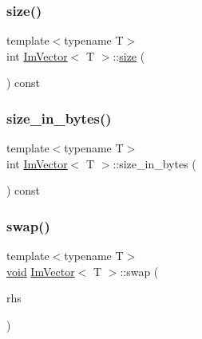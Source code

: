 \mbox{\label{structImVector_a8c903ecb1aaee0601b6a8ad835a4a435}} 
\subsubsection{\texorpdfstring{size()}{size()}}
{\footnotesize\ttfamily template$<$typename T$>$ \\
int \hyperlink{structImVector}{Im\+Vector}$<$ T $>$\+::\hyperlink{imgui__impl__opengl3__loader_8h_a3d1e3edfcf61ca2d831883e1afbad89e}{size} (\begin{DoxyParamCaption}{ }\end{DoxyParamCaption}) const\hspace{0.3cm}{\ttfamily [inline]}}

\mbox{\label{structImVector_ade9f2e937e47b0e0f9970dcfba038204}} 
\subsubsection{\texorpdfstring{size\+\_\+in\+\_\+bytes()}{size\_in\_bytes()}}
{\footnotesize\ttfamily template$<$typename T$>$ \\
int \hyperlink{structImVector}{Im\+Vector}$<$ T $>$\+::size\+\_\+in\+\_\+bytes (\begin{DoxyParamCaption}{ }\end{DoxyParamCaption}) const\hspace{0.3cm}{\ttfamily [inline]}}

\mbox{\label{structImVector_afcec0d2a1e28aebe412b6efd06f0a77a}} 
\subsubsection{\texorpdfstring{swap()}{swap()}}
{\footnotesize\ttfamily template$<$typename T$>$ \\
\hyperlink{imgui__impl__opengl3__loader_8h_ac668e7cffd9e2e9cfee428b9b2f34fa7}{void} \hyperlink{structImVector}{Im\+Vector}$<$ T $>$\+::swap (\begin{DoxyParamCaption}\item[{\hyperlink{structImVector}{Im\+Vector}$<$ T $>$ \&}]{rhs }\end{DoxyParamCaption})\hspace{0.3cm}{\ttfamily [inline]}}



